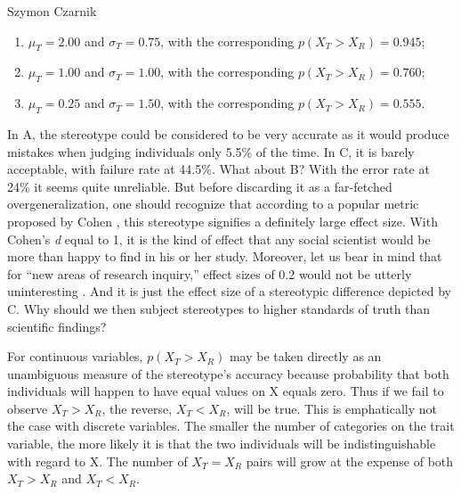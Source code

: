 \begin{artengenv}{Szymon Czarnik}
\begin{flushleft}
\begin{enumerate}[label=\Alph*)]
\item
  \(\mu_{T} = 2.00\) and \(\sigma_{T} = 0.75\), with the corresponding
  \(p\left( X_{T} > X_{R} \right) = 0.945\);
\item
  \(\mu_{T} = 1.00\) and \(\sigma_{T} = 1.00\), with the corresponding
  \(p\left( X_{T} > X_{R} \right) = 0.760\);
\item
  \(\mu_{T} = 0.25\) and \(\sigma_{T} = 1.50\), with the corresponding
  \(p\left( X_{T} > X_{R} \right) = 0.555\).
\end{enumerate}
\end{flushleft}
In A, the stereotype could be considered to be very accurate as it would produce mistakes when judging individuals only 5.5\% of the time. In C, it is barely acceptable, with failure rate at 44.5\%. What about B? With the error rate at 24\% it seems quite unreliable. But before discarding it as a far-fetched overgeneralization, one should recognize that according to a popular metric proposed by Cohen
\parencite*[][]{cohen_statistical_1988}, %
 this stereotype signifies a definitely large effect size. With Cohen's \textit{d} equal to 1, it is the kind of effect that any social scientist would be more than happy to find in his or her study. Moreover, let us bear in mind that for ``new areas of research inquiry,'' effect sizes of 0.2 would not be utterly uninteresting 
\parencite[][p.25]{cohen_statistical_1988}. %
 And it is just the effect size of a stereotypic difference depicted by C. Why should we then subject stereotypes to higher standards of truth than scientific findings?

For continuous variables, \(p\left( X_{T} > X_{R} \right)\) may be taken
directly as an unambiguous measure of the stereotype's accuracy because
probability that both individuals will happen to have equal values on X
equals zero. Thus if we fail to observe \(X_{T} > X_{R}\), the reverse,
\(X_{T} < X_{R}\), will be true. This is emphatically not the case with
discrete variables. The smaller the number of categories on the trait
variable, the more likely it is that the two individuals will be
indistinguishable with regard to X. The number of \(X_{T} = X_{R}\)
pairs will grow at the expense of both \(X_{T} > X_{R}\) and
\(X_{T} < X_{R}\).


\end{artengenv}
